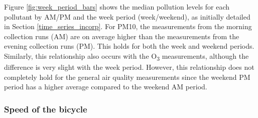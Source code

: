 \documentclass[11pt]{report}
\begin{document}
Figure \ref{fig:week_period_bars} shows the median pollution levels for each pollutant by AM/PM and the week period (week/weekend), as initially detailed in Section \ref{time_series_incorp}. For PM10, the measurements from the morning collection runs (AM) are on average higher than the measurements from the evening collection runs (PM). This holds for both the week and weekend periods. Similarly, this relationship also occurs with the O\textsubscript{3} measurements, although the difference is very slight with the week period. However, this relationship does not completely hold for the general air quality measurements since the weekend PM period has a higher average compared to the weekend AM period.




\subsubsection{Speed of the bicycle}
\end{document}
